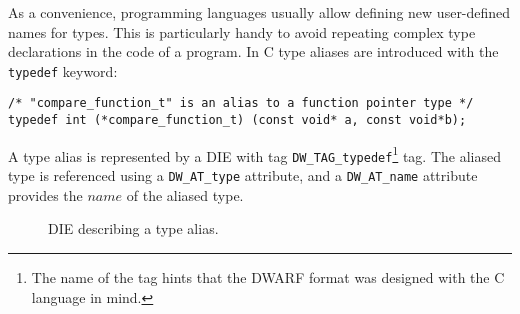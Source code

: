 As a convenience, programming languages usually allow defining new user-defined
names for types. This is particularly handy to avoid repeating complex type
declarations in the code of a program. In C type aliases are introduced with
the \texttt{typedef} keyword:

\begin{verbatim}
/* "compare_function_t" is an alias to a function pointer type */
typedef int (*compare_function_t) (const void* a, const void*b);
\end{verbatim}

A type alias is represented by a DIE with tag
\verb|DW_TAG_typedef|\footnote{The name of the tag hints that
the DWARF format was designed with the C language in mind.} tag. The aliased
type is referenced using a \verb|DW_AT_type| attribute, and
a \verb|DW_AT_name| attribute provides the $ name $ of the aliased type.

\begin{figure}
  \centering
  \caption{DIE describing a type alias.}
  \label{fig:typedef-die}
\end{figure}



